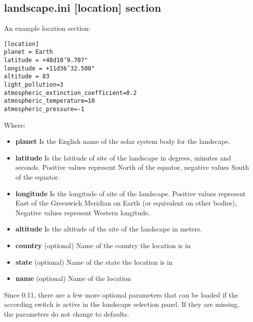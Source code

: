 \subsection{landscape.ini {[}location{]}
section}\label{landscape.ini-location-section}

An example location section:

\begin{config}
\texttt{{[}location{]}}\\
\texttt{planet~=~Earth}\\
\texttt{latitude~=~+48d10'9.707"}\\
\texttt{longitude~=~+11d36'32.508"}\\
\texttt{altitude~=~83}\\
\texttt{light\_pollution=3}\\
\texttt{atmospheric\_extinction\_coefficient=0.2}\\
\texttt{atmospheric\_temperature=10}\\
\texttt{atmospheric\_pressure=-1}
\end{config}

Where:

\begin{itemize}
\item
  \textbf{planet} Is the English name of the solar system body for the
  landscape.
\item
  \textbf{latitude} Is the latitude of site of the landscape in degrees,
  minutes and seconds. Positive values represent North of the equator,
  negative values South of the equator.
\item
  \textbf{longitude} Is the longitude of site of the landscape. Positive
  values represent East of the Greenwich Meridian on Earth (or
  equivalent on other bodies), Negative values represent Western
  longitude.
\item
  \textbf{altitude} Is the altitude of the site of the landscape in
  meters.
\item
  \textbf{country} (optional) Name of the country the location is in
\item
  \textbf{state} (optional) Name of the state the location is in
\item
  \textbf{name} (optional) Name of the location
\end{itemize}

Since 0.11, there are a few more optional parameters that can be loaded
if the according switch is active in the landscape selection panel. If
they are missing, the parameters do not change to defaults.

